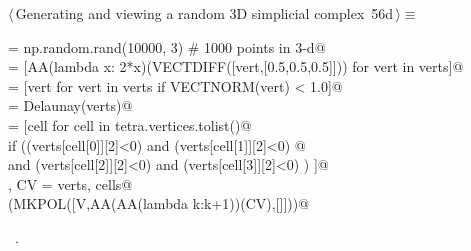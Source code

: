 \documentclass[11pt,oneside]{article}	%
\begin{document}
\begin{flushleft} \small \label{scrap102}
\protect{}$\langle\,$Generating and viewing a random 3D simplicial complex\nobreak\ {\footnotesize 56d}$\,\rangle\equiv$
\vspace{-1ex}
\begin{list}{}{} \item
\mbox{}\verb@verts = np.random.rand(10000, 3) # 1000 points in 3-d@\\
\mbox{}\verb@verts = [AA(lambda x: 2*x)(VECTDIFF([vert,[0.5,0.5,0.5]])) for vert in verts]@\\
\mbox{}\verb@verts = [vert for vert in verts if VECTNORM(vert) < 1.0]@\\
\mbox{}\verb@tetra = Delaunay(verts)@\\
\mbox{}\verb@cells = [cell for cell in tetra.vertices.tolist()@\\
\mbox{}\verb@       if  ((verts[cell[0]][2]<0) and (verts[cell[1]][2]<0) @\\
\mbox{}\verb@            and (verts[cell[2]][2]<0) and (verts[cell[3]][2]<0) ) ]@\\
\mbox{}\verb@V, CV = verts, cells@\\
\mbox{}\verb@VIEW(MKPOL([V,AA(AA(lambda k:k+1))(CV),[]]))@\\
\mbox{}\verb@@{\NWsep}
\end{list}
\vspace{-1ex}
\footnotesize\addtolength{\baselineskip}{-1ex}
\begin{list}{}{\setlength{\itemsep}{-\parsep}\setlength{\itemindent}{-\leftmargin}}
\item \NWtxtMacroRefIn\ .
\end{list}
\end{flushleft}
\end{document}
